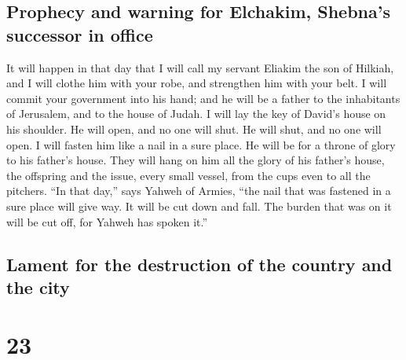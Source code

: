 \hypertarget{prophecy-and-warning-for-elchakim-shebnas-successor-in-office}{%
\subsection{Prophecy and warning for Elchakim, Shebna's successor in
office}\label{prophecy-and-warning-for-elchakim-shebnas-successor-in-office}}

 It will happen in that day that I will call my servant
Eliakim the son of Hilkiah,  and I will clothe him with
your robe, and strengthen him with your belt. I will commit your
government into his hand; and he will be a father to the inhabitants of
Jerusalem, and to the house of Judah.  I will lay the key
of David's house on his shoulder. He will open, and no one will shut. He
will shut, and no one will open.  I will fasten him like
a nail in a sure place. He will be for a throne of glory to his father's
house.  They will hang on him all the glory of his
father's house, the offspring and the issue, every small vessel, from
the cups even to all the pitchers.  ``In that day,'' says
Yahweh of Armies, ``the nail that was fastened in a sure place will give
way. It will be cut down and fall. The burden that was on it will be cut
off, for Yahweh has spoken it.''

\hypertarget{lament-for-the-destruction-of-the-country-and-the-city}{%
\subsection{Lament for the destruction of the country and the
city}\label{lament-for-the-destruction-of-the-country-and-the-city}}

\hypertarget{section-22}{%
\section{23}\label{section-22}}

